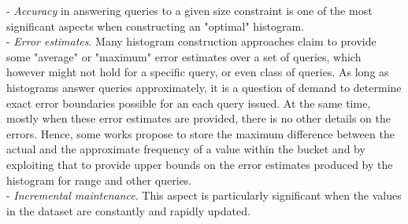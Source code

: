 \documentclass[10pt, conference, compsocconf]{IEEEtran}
\begin{document}
- \textit{Accuracy} in answering queries to a given size constraint is one of the most significant aspects when constructing an "optimal" histogram. \\
- \textit{Error estimates}. Many histogram construction approaches claim to provide some "average" or "maximum" error estimates over a set of queries, which however might not hold for a specific query, or even class of queries. As long as histograms answer queries approximately, it is a question of demand to determine exact error boundaries possible for an each query issued. At the same time, mostly when these error estimates are provided, there is no other details on the errors. Hence, some works propose to store the maximum difference between the actual and the approximate frequency of a value within the bucket and by exploiting that to provide upper bounds on the error estimates produced by the histogram for range and other queries.\\
- \textit{Incremental maintenance}. This aspect is particularly significant when the values in the dataset are constantly and rapidly updated.
\end{document}
